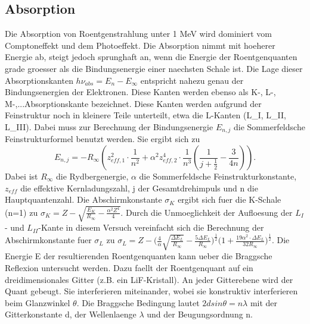 \subsection{Absorption}
Die Absorption von Roentgenstrahlung unter 1 MeV wird dominiert vom Comptoneffekt und dem Photoeffekt. Die Absorption nimmt mit hoeherer Energie ab, steigt jedoch sprunghaft an, wenn die Energie der Roentgenquanten grade groesser als die Bindungsenergie einer naechsten Schale ist. Die Lage dieser Absorptionskanten $h\nu_{abs}=E_n-E_{\infty}$ entspricht nahezu genau der Bindungsenergien der Elektronen. Diese Kanten werden ebenso als K-, L-, M-,...Absorptionskante bezeichnet. Diese Kanten werden aufgrund der Feinstruktur noch in kleinere Teile unterteilt, etwa die L-Kanten (L_I, L_{II}, L_{III}). Dabei muss zur Berechnung der Bindungsenergie $E_{n,j}$ die Sommerfeldsche Feinstrukturformel benutzt werden. Sie ergibt sich zu 
\begin{equation*}
    E_{n,j}=-R_\infty(z^2_{eff,1}\cdot\frac{1}{n^2}+\alpha^2z^4_{eff,2}\cdot\frac{1}{n^3}(\frac{1}{j+\frac{1}{2}}-\frac{3}{4n})).
\end{equation*}
Dabei ist $R_\infty$ die Rydbergenergie, $\alpha$ die Sommerfeldsche Feinstrukturkonstante, $z_{eff}$ die effektive Kernladungszahl, j der Gesamtdrehimpuls und n die Hauptquantenzahl. Die Abschirmkonstante $\sigma_K$ ergibt sich fuer die K-Schale (n=1) zu $\sigma_K=Z-\sqrt{\frac{E_K}{R_\infty}-\frac{\alpha^2Z^4}{4}}$.
Durch die Unmoeglichkeit der Aufloesung der $L_I$- und $L_{II}$-Kante in diesem Versuch vereinfacht sich die Berechnung der Abschirmkonstante fuer $\sigma_L$ zu $\sigma_L=Z-\Bigg(\frac{4}{\alpha}\sqrt{\frac{\Delta E_L}{R_\infty}}-\frac{5\Delta E_L}{R_\infty}\Bigg)^{\frac{1}{2}}\Bigg(1+\frac{19\alpha^2\cdot\Delta E_L}{32R_\infty}\Bigg)^{\frac{1}{2}}$.
Die Energie E der resultierenden Roentgenquanten kann ueber die Braggsche Reflexion untersucht werden. Dazu faellt der Roentgenquant auf ein dreidimensionales Gitter (z.B. ein LiF-Kristall). An jeder Gitterebene wird der Quant gebeugt. Sie interferieren miteinander, wobei sie konstruktiv interferieren beim Glanzwinkel $\theta$. Die Braggsche Bedingung lautet $2dsin\theta=n\lambda$ mit der Gitterkonstante d, der Wellenlaenge $\lambda$ und der Beugungsordnung n.